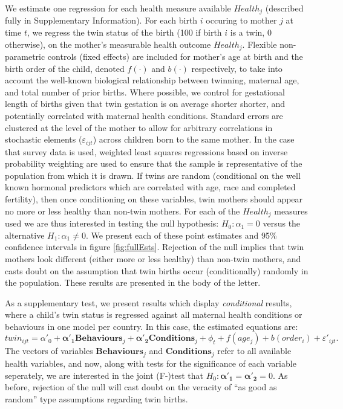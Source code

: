 \documentclass{nature}
\begin{document}
\begin{linenumbers}
We estimate one regression for each health measure available $Health_j$ (described fully in Supplementary Information).  For each birth $i$ occuring to mother $j$ at time $t$, we regress the twin status of the birth (100 if birth $i$ is a twin, 0 otherwise), on the mother's measurable health outcome $Health_j$. Flexible non-parametric controls (fixed effects) are included for mother's age at birth and the birth order of the child, denoted $f(\cdot)$ and $b(\cdot)$ respectively, to take into account the well-known biological relationship between twinning, maternal age, and total number of prior births.  Where possible, we control for gestational length of births given that twin gestation is on average shorter shorter, and potentially correlated with maternal health conditions\cite{Morrison2005}.  Standard errors are clustered at the level of the mother to allow for arbitrary correlations in stochastic elements ($\varepsilon_{ijt}$) across children born to the same mother. In the case that survey data is used, weighted least squares regressions based on inverse probability weighting are used to ensure that the sample is representative of the population from which it is drawn. If twins are random (conditional on the well known  hormonal predictors which are correlated with age, race and completed fertility\cite{Hall2003,Hoekstraetal2008}), then once conditioning on these variables, twin mothers should appear no more or less healthy than non-twin mothers.  For each of the $Health_j$ measures used we are thus interested in testing the null hypothesis: $H_0: \alpha_1=0$ versus the alternative $H_1: \alpha_1\neq0$.  We present each of these point estimates and 95\% confidence intervals in figure \ref{fig:fullEsts}. Rejection of the null implies that twin mothers look different (either more or less healthy) than non-twin mothers, and casts doubt on the assumption that twin births occur (conditionally) randomly in the population.  These results are presented in the body of the letter.



As a supplementary test, we present results which display \emph{conditional} results, where a child's twin status is regressed against all maternal health conditions or behaviours in one model per country.  In this case, the estimated equations are:
\begin{equation}
  \label{reg:twincond}
  twin_{ijt}=\alpha'_0 + \bm{\alpha'_1} \bm{Behaviours}_j + \bm{\alpha'_2} \bm{Conditions}_j + \phi_t + f(age_j) + b(order_i) + \varepsilon'_{ijt}.
\end{equation}
The vectors of variables $\bm{Behaviours}_j$ and $\bm{Conditions}_j$ refer to all available health variables, and now, along with tests for the significance of each variable seperately, we are interested in the joint (F-)test that $H_0:\bm{\alpha'_1}=\bm{\alpha'_2}=0$.  As before, rejection of the null will cast doubt on the veracity of ``as good as random'' type assumptions regarding twin births.


\end{linenumbers}
\end{document}

